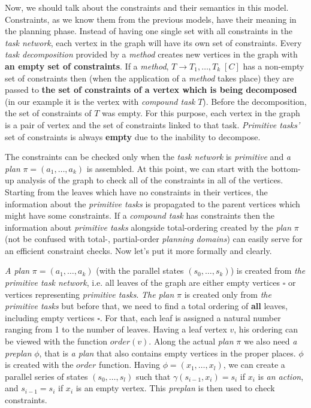 \medskip\noindent
Now, we should talk about the constraints and their semantics in this model. Constraints, as we know them from the previous models, have their meaning in the planning phase. Instead of having one single set with all constraints in the \emph{task network}, each vertex in the graph will have its own set of constraints. Every \emph{task decomposition} provided by a \emph{method} creates new vertices in the graph with \textbf{an empty set of constraints}. If a \emph{method}, $T \rightarrow T_1, \dots, T_k \; [C]$ has a non-empty set of constraints then (when the application of a \emph{method} takes place) they are passed to \textbf{the set of constraints of a vertex which is being decomposed} (in our example it is the vertex with \emph{compound task} $T$). Before the decomposition, the set of constraints of $T$ was empty. For this purpose, each vertex in the graph is a pair of vertex and the set of constraints linked to that task. \emph{Primitive tasks'} set of constraints is always \textbf{empty} due to the inability to decompose.

\medskip\noindent
The constraints can be checked only when the \emph{task network} is \emph{primitive} and \emph{a plan} $\pi = (a_1, \dots, a_k)$ is assembled. At this point, we can start with the bottom-up analysis of the graph to check all of the constraints in all of the vertices. Starting from the leaves which have no constraints in their vertices, the information about the \emph{primitive tasks} is propagated to the parent vertices which might have some constraints. If a \emph{compound task} has constraints then the information about \emph{primitive tasks} alongside total-ordering created by the \emph{plan} $\pi$ (not be confused with total-, partial-order \emph{planning domains}) can easily serve for an efficient constraint checks. Now let's put it more formally and clearly.

\medskip\noindent
\emph{A plan} $\pi = (a_1, \dots, a_k)$ (with the parallel states $(s_0, \dots, s_k)$) is created from \emph{the primitive task network}, i.e. all leaves of the graph are either empty vertices $\square$ or vertices representing \emph{primitive tasks}. \emph{The plan} $\pi$ is created only from \emph{the primitive tasks} but before that, we need to find a total ordering of \textbf{all} leaves, including empty vertices $\square$. For that, each leaf is assigned a natural number ranging from 1 to the number of leaves. Having a leaf vertex $v$, his ordering can be viewed with the function $order(v)$. Along the actual \emph{plan} $\pi$ we also need \emph{a preplan} $\phi$, that is \emph{a plan} that also contains empty vertices in the proper places. $\phi$ is created with the $order$ function. Having $\phi = (x_1, \dots, x_l)$, we can create a parallel series of states $(s_0, \dots, s_l)$ such that $\gamma(s_{i-1}, x_i) = s_i$ if $x_i$ is \emph{an action}, and $s_{i-1} = s_i$ if $x_i$ is an empty vertex. This \emph{preplan} is then used to check constraints.

